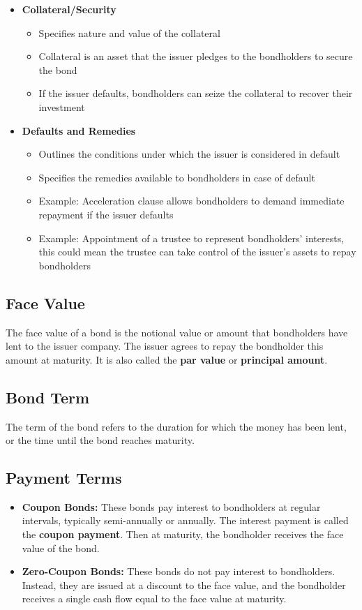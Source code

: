 \begin{itemize}
\begin{itemize}
    \end{itemize}
    \item \textbf{Collateral/Security}
    \begin{itemize}
        \item Specifies nature and value of the collateral
        \item Collateral is an asset that the issuer pledges to the bondholders to secure the bond
        \item If the issuer defaults, bondholders can seize the collateral to recover their investment
    \end{itemize}
    \item \textbf{Defaults and Remedies}
    \begin{itemize}
        \item Outlines the conditions under which the issuer is considered in default
        \item Specifies the remedies available to bondholders in case of default
        \item Example: Acceleration clause allows bondholders to demand immediate repayment if the issuer defaults
        \item Example: Appointment of a trustee to represent bondholders' interests, this could mean the trustee can take control of the issuer's assets to repay bondholders
    \end{itemize}
\end{itemize}

\subsection*{Face Value}
The face value of a bond is the notional value or amount that bondholders have lent to the issuer company. The issuer agrees to repay the bondholder this amount at maturity. It is also called the \textbf{par value} or \textbf{principal amount}.

\subsection*{Bond Term}
The term of the bond refers to the duration for which the money has been lent, or the time until the bond reaches maturity.

\subsection*{Payment Terms}
\begin{itemize}
    \item \textbf{Coupon Bonds:} These bonds pay interest to bondholders at regular intervals, typically semi-annually or annually. The interest payment is called the \textbf{coupon payment}. Then at maturity, the bondholder receives the face value of the bond.
    \item \textbf{Zero-Coupon Bonds:} These bonds do not pay interest to bondholders. Instead, they are issued at a discount to the face value, and the bondholder receives a single cash flow equal to the face value at maturity.
\end{itemize}

